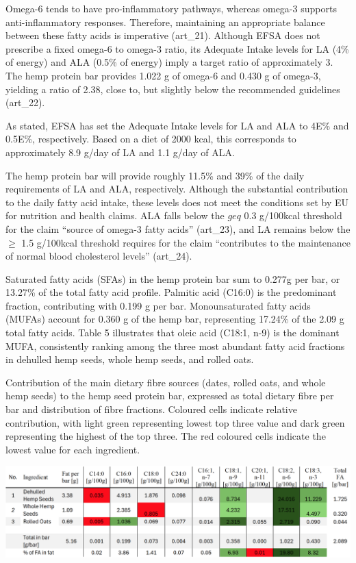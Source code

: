 \vspace{1em}
Omega-6 tends to have pro-inflammatory pathways, whereas omega-3 supports anti-inflammatory responses. Therefore, maintaining an appropriate balance between these fatty acids is imperative (art\_21). Although EFSA does not prescribe a fixed omega-6 to omega-3 ratio, its Adequate Intake levels for LA (4\% of energy) and ALA (0.5\% of energy) imply a target ratio of approximately 3. The hemp protein bar provides 1.022 g of omega-6 and 0.430 g of omega-3, yielding a ratio of 2.38, close to, but slightly below the recommended guidelines (art\_22). 

\vspace{1em}
As stated, EFSA has set the Adequate Intake levels for LA and ALA to 4E\% and 0.5E\%, respectively. Based on a diet of 2000 kcal, this corresponds to approximately 8.9 g/day of LA and 1.1 g/day of ALA. 

\vspace{1em}
The hemp protein bar will provide roughly 11.5\% and 39\% of the daily requirements of LA and ALA, respectively. Although the substantial contribution to the daily fatty acid intake, these levels does not meet the conditions set by EU for nutrition and health claims. ALA falls below the $geq$ 0.3 g/100kcal threshold for the claim “source of omega-3 fatty acids” (art\_23), and LA remains below the $\geq$ 1.5 g/100kcal threshold requires for the claim “contributes to the maintenance of normal blood cholesterol levels” (art\_24).

\vspace{1em}
Saturated fatty acids (SFAs) in the hemp protein bar sum to 0.277g per bar, or 13.27\% of the total fatty acid profile. Palmitic acid (C16:0) is the predominant fraction, contributing with 0.199 g per bar. 
Monounsaturated fatty acids (MUFAs) account for 0.360 g of the hemp bar, representing 17.24\% of the 2.09 g total fatty acids. Table 5 illustrates that oleic acid (C18:1, n-9) is the dominant MUFA, consistently ranking among the three most abundant fatty acid fractions in dehulled hemp seeds, whole hemp seeds, and rolled oats. 


\begin{table}[H]
    \centering
    \caption{Contribution of the main dietary fibre sources (dates, rolled oats, and whole hemp seeds) to the hemp seed protein bar,
    expressed as total dietary fibre per bar and distribution of fibre fractions. Coloured cells indicate relative contribution, with light
    green representing lowest top three value and dark green representing the highest of the top three. The red coloured cells indicate the
    lowest value for each ingredient.}
    \label{tab:fatty_acid_tab_01}
    \includegraphics[angle=90,origin=c,width=0.25\textheight]{Figures/tab_fatty_01.png}
\end{table}
